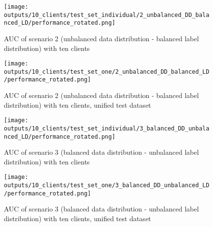 

\begin{figure}[htb!]
    \centering
    \texttt{[image: outputs/10\_clients/test\_set\_individual/2\_unbalanced\_DD\_balanced\_LD/performance\_rotated.png]}
    \caption{AUC of scenario 2 (unbalanced data distribution - balanced label distribution) with ten clients}
    \label{fig:auc_box_10_clients_scenario_2}
\end{figure}



\begin{figure}[htb!]
    \centering
    \texttt{[image: outputs/10\_clients/test\_set\_one/2\_unbalanced\_DD\_balanced\_LD/performance\_rotated.png]}
    \caption{AUC of scenario 2 (unbalanced data distribution - balanced label distribution) with ten clients, unified test dataset}
    \label{fig:auc_box_10_clients_scenario_2_uni}
\end{figure}



\begin{figure}[htb!]
    \centering
    \texttt{[image: outputs/10\_clients/test\_set\_individual/3\_balanced\_DD\_unbalanced\_LD/performance\_rotated.png]}
    \caption{AUC of scenario 3 (balanced data distribution - unbalanced label distribution) with ten clients}
    \label{fig:auc_box_10_clients_scenario_3}
\end{figure}



\begin{figure}[htb!]
    \centering
    \texttt{[image: outputs/10\_clients/test\_set\_one/3\_balanced\_DD\_unbalanced\_LD/performance\_rotated.png]}
    \caption{AUC of scenario 3 (balanced data distribution - unbalanced label distribution) with ten clients, unified test dataset}
    \label{fig:auc_box_10_clients_scenario_3_uni}
\end{figure}

